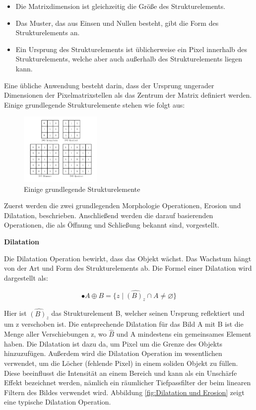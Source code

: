 \begin{itemize}
\item Die Matrixdimension ist gleichzeitig die Größe des Strukturelements.
\item Das Muster, das aus Einsen und Nullen besteht, gibt die Form des Strukturelements an.
\item Ein Ursprung des Strukturelements ist üblicherweise ein Pixel innerhalb des Strukturelements, welche aber auch außerhalb des Strukturelements liegen kann. 
\end{itemize}

Eine übliche Anwendung besteht darin, dass der Ursprung ungerader Dimensionen der Pixelmatrixstellen als das Zentrum der Matrix definiert werden. Einige grundlegende Strukturelemente stehen wie folgt aus:

\begin{figure}[H]
 \centering 
  \includegraphics[keepaspectratio,width=0.35\textwidth]{images/4_ZweiteErfahrung/Morphological/strelement.pdf}
 \caption{Einige grundlegende Strukturelemente}
 \label{fig:Strukturelemente}
\end{figure} 

Zuerst werden die zwei grundlegenden Morphologie Operationen, Erosion und Dilatation, beschrieben. Anschließend werden die darauf basierenden Operationen, die als Öffnung und Schließung bekannt sind, vorgestellt.

\textbf{Dilatation}

Die Dilatation Operation bewirkt, dass das Objekt wächst. Das Wachstum hängt von der Art und Form des Strukturelements ab. Die Formel einer Dilatation wird dargestellt als:

\begin{equation}
•A \oplus B =\lbrace z \mid \widehat{(B)_z} \cap A \ne \varnothing \rbrace  
\end{equation}

Hier ist $ \widehat{(B)_z} $ das Strukturelement B, welcher seinen Ursprung reflektiert und um z verschoben ist. Die entsprechende Dilatation für das Bild A mit B ist die Menge aller Verschiebungen z, wo $ \widehat{B} $ und A mindestens ein gemeinsames Element haben. Die Dilatation ist dazu da, um Pixel um die Grenze des Objekts hinzuzufügen. Außerdem wird die Dilatation Operation im wesentlichen verwendet, um die Löcher (fehlende Pixel) in einem soliden Objekt zu füllen. Diese beeinflusst die Intensität an einem Bereich und kann als ein Unschärfe Effekt bezeichnet werden, nämlich ein räumlicher Tiefpassfilter der beim linearen Filtern des Bildes verwendet wird. Abbildung \ref{fig:Dilatation und Erosion} zeigt eine typische Dilatation Operation.

